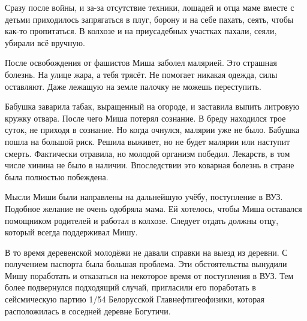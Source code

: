 Сразу после войны, и за-за отсутствие техники, лошадей и отца маме вместе с детьми приходилось запрягаться в плуг, борону и на себе пахать, сеять, чтобы как-то пропитаться. В колхозе и на приусадебных участках пахали, сеяли, убирали всё вручную.

После освобождения от фашистов Миша заболел малярией. Это страшная болезнь. На улице жара, а тебя трясёт. Не помогает никакая одежда, силы оставляют. Даже лежащую на земле палочку не можешь переступить. 

Бабушка заварила табак, выращенный на огороде, и заставила выпить литровую кружку отвара. После чего Миша потерял сознание. В бреду находился трое суток, не приходя в сознание. Но когда очнулся, малярии уже не было. Бабушка пошла на большой риск. Решила выживет, но не будет малярии или наступит смерть. Фактически отравила, но молодой организм победил. Лекарств, в том числе хинина не было в наличии. Впоследствии это коварная болезнь в стране была полностью побеждена.

Мысли Миши были направлены на дальнейшую учёбу, поступление в ВУЗ. Подобное желание не очень одобряла мама. Ей хотелось, чтобы Миша оставался помощником родителей и работал в колхозе. Следует отдать должны отцу, который всегда поддерживал Мишу. 

В то время деревенской молодёжи не давали справки на выезд из деревни. С получением паспорта была большая проблема. Эти обстоятельства вынудили Мишу поработать и отказаться на некоторое время от поступления в ВУЗ. Тем более подвернулся подходящий случай, пригласили его поработать в сейсмическую партию 1/54 Белорусской Главнефтигеофизики, которая расположилась в соседней деревне Богутичи.